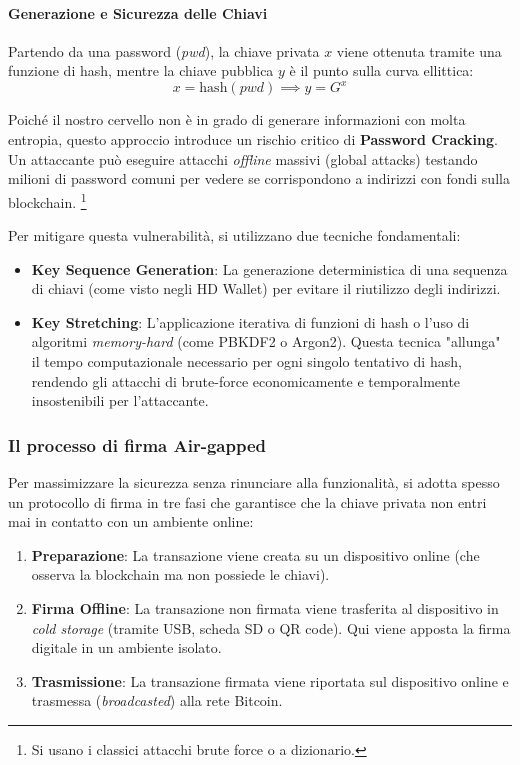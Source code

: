 \paragraph{Generazione e Sicurezza delle Chiavi}
Partendo da una password (\textit{pwd}), la chiave privata $x$ viene ottenuta tramite una funzione di hash, mentre la chiave pubblica $y$ è il punto sulla curva ellittica:
\[ x = \text{hash}(pwd) \implies y = G^x \]

Poiché il nostro cervello non è in grado di generare informazioni con molta entropia, questo approccio introduce un rischio critico di \textbf{Password Cracking}. 
Un attaccante può eseguire attacchi \textit{offline} massivi (global attacks) testando milioni di password comuni per vedere se corrispondono a indirizzi con fondi sulla blockchain. \footnote{Si usano i classici attacchi brute force o a dizionario.}

Per mitigare questa vulnerabilità, si utilizzano due tecniche fondamentali:

\begin{itemize}
    \item \textbf{Key Sequence Generation}: La generazione deterministica di una sequenza di chiavi (come visto negli HD Wallet) per evitare il riutilizzo degli indirizzi.
    \item \textbf{Key Stretching}: L'applicazione iterativa di funzioni di hash o l'uso di algoritmi \textit{memory-hard} (come PBKDF2 o Argon2). Questa tecnica "allunga" il tempo computazionale necessario per ogni singolo tentativo di hash, rendendo gli attacchi di brute-force economicamente e temporalmente insostenibili per l'attaccante.
\end{itemize}


\subsubsection*{Il processo di firma Air-gapped}
Per massimizzare la sicurezza senza rinunciare alla funzionalità, si adotta spesso un protocollo di firma in tre fasi che garantisce che la chiave privata non entri mai in contatto con un ambiente online:
\begin{enumerate}
    \item \textbf{Preparazione}: La transazione viene creata su un dispositivo online (che osserva la blockchain ma non possiede le chiavi).
    \item \textbf{Firma Offline}: La transazione non firmata viene trasferita al dispositivo in \textit{cold storage} (tramite USB, scheda SD o QR code). Qui viene apposta la firma digitale in un ambiente isolato.
    \item \textbf{Trasmissione}: La transazione firmata viene riportata sul dispositivo online e trasmessa (\textit{broadcasted}) alla rete Bitcoin.
\end{enumerate}

